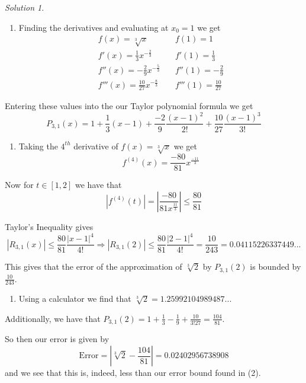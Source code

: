 \documentclass[
]{book}
\providecommand{\tightlist}{%
  \setlength{\itemsep}{0pt}\setlength{\parskip}{0pt}}
\theoremstyle{definition}
\theoremstyle{definition}
\theoremstyle{definition}
\theoremstyle{definition}
\theoremstyle{remark}
\newtheorem*{solution}{Solution}
\begin{document}
\begin{solution}

\begin{enumerate}
\def\labelenumi{\arabic{enumi}.}
\tightlist
\item
  Finding the derivatives and evaluating at \(x_0=1\) we get
  \begin{align*}
   f(x)=\sqrt[3]{x} & \quad  f(1)=1\\
   f'(x)=\frac{1}{3}x^{-\frac{2}{3}} &  \quad  f'(1)= \frac{1}{3}\\
   f''(x)=-\frac{2}{9}x^{-\frac{5}{3}} &  \quad  f''(1)= -\frac{2}{9}\\
   f'''(x)=\frac{10}{27}x^{-\frac{8}{3}} &  \quad  f'''(1)= \frac{10}{27}
  \end{align*}
\end{enumerate}

Entering these values into the our Taylor polynomial formula we get
\[P_{3,1}(x)=1+\frac{1}{3}(x-1)+\frac{-2}{9}\frac{(x-1)^2}{2!}+\frac{10}{27}\frac{(x-1)^3}{3!}\]

\begin{enumerate}
\def\labelenumi{\arabic{enumi}.}
\setcounter{enumi}{1}
\tightlist
\item
  Taking the \(4^{th}\) derivative of \(f(x)=\sqrt[3]{x}\) we get
  \[ f^{(4)}(x)=\frac{-80}{81}x^{\frac{-11}{3}}\]
\end{enumerate}

Now for \(t\in [1,2]\) we have that
\[|f^{(4)}(t)|=\left|\frac{-80}{81x^{\frac{11}{3}}}\right|\leq \frac{80}{81}\]

Taylor's Inequality gives
\[|R_{3,1}(x)|\leq \frac{80}{81}\frac{|x-1|^4}{4!}\Rightarrow|R_{3,1}(2)|\leq \frac{80}{81}\frac{|2-1|^4}{4!}=\frac{10}{243}=0.04115226337449...\]

This gives that the error of the approximation of \(\sqrt[3]{2}\) by \(P_{3,1}(2)\) is bounded by \(\displaystyle\frac{10}{243}\).

\begin{enumerate}
\def\labelenumi{\arabic{enumi}.}
\setcounter{enumi}{2}
\tightlist
\item
  Using a calculator we find that \(\sqrt[3]{2}=1.25992104989487...\)
\end{enumerate}

Additionally, we have that \(\displaystyle P_{3,1}(2)=1+\frac{1}{3}-\frac{1}{9}+\frac{10}{3!27}=\frac{104}{81}\).

So then our error is given by
\[
\mbox{Error}=\left|\sqrt[3]{2}-\frac{104}{81}\right|=0.02402956738908
\]
and we see that this is, indeed, less than our error bound found in (2).

\end{solution}
\end{document}
